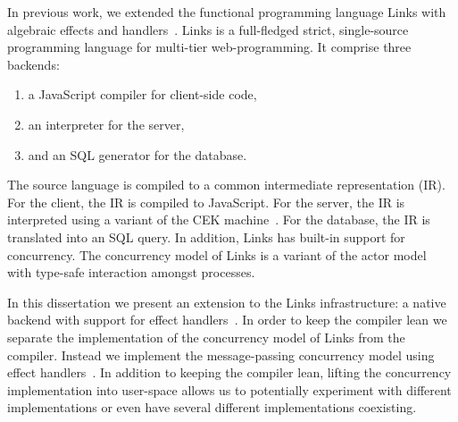 \documentclass[12pt,mscres,cdtppar,twoside,openright,logo,rightchapter,normalheadings]{infthesis}
\theoremstyle{definition}
\begin{document}
In previous work, we extended the functional programming language
Links with algebraic effects and
handlers~\citep{Hillerstrom2015}. Links is a full-fledged strict,
single-source programming language for multi-tier web-programming. It
comprise three backends:
\begin{enumerate}
  \item a JavaScript compiler for client-side code,
  \item an interpreter for the server,
  \item and an SQL generator for the database.
\end{enumerate}
The source language is compiled to a common intermediate
representation (IR).  For the client, the IR is compiled to
JavaScript. For the server, the IR is interpreted using a variant of
the CEK machine~\citep{Felleisen1986,Hillerstrom2016a}. For the
database, the IR is translated into an SQL query.
%
In addition, Links has built-in support for concurrency. The
concurrency model of Links is a variant of the actor
model~\citep{Hewitt1977} with type-safe interaction amongst processes.

In this dissertation we present an extension to the Links
infrastructure: a native backend with support for effect
handlers~\citep{Hillerstrom2016b}. In order to keep the compiler lean
we separate the implementation of the concurrency model of Links from
the compiler. Instead we implement the message-passing concurrency
model using effect handlers~\citep{Hillerstrom2016c}. In addition to
keeping the compiler lean, lifting the concurrency implementation into
user-space allows us to potentially experiment with different
implementations or even have several different implementations
coexisting.

\end{document}
